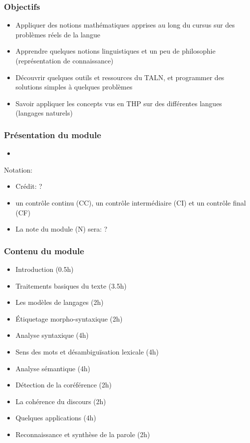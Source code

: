 \documentclass{beamer}
\begin{document}
\begin{frame}
\frametitle{Objectifs}

\begin{itemize}
	\item Appliquer des notions mathématiques apprises au long du cursus sur des problèmes réels de la langue 
	\item Apprendre quelques notions linguistiques et un peu de philosophie (représentation de connaissance) 
	\item Découvrir quelques outils et ressources du TALN, et programmer des solutions simples à quelques problèmes
	\item Savoir appliquer les concepts vus en THP sur des différentes langues (langages naturels)
\end{itemize}

\end{frame}


\begin{frame}
\frametitle{Présentation du module}

\begin{itemize}
	\item 
\end{itemize}

Notation:
\begin{itemize}
	\item Crédit: ?
	\item un contrôle continu (CC), un contrôle intermédiaire (CI) et un contrôle final (CF)
	\item La note du module (N) sera: ?
\end{itemize}

\end{frame}

\begin{frame}
\frametitle{Contenu du module}

\begin{itemize}
	\item Introduction (0.5h)
	\item Traitements basiques du texte (3.5h)
	\item Les modèles de langages (2h)
	\item Étiquetage morpho-syntaxique (2h)
	\item Analyse syntaxique (4h)
	\item Sens des mots et désambiguïsation lexicale (4h)
	\item Analyse sémantique (4h)
	\item Détection de la coréférence (2h)
	\item La cohérence du discours (2h)
	\item \color{red} Quelques applications (4h)
	\item \color{red} Reconnaissance et synthèse de la parole (2h)
\end{itemize}

\end{frame}
\end{document}

